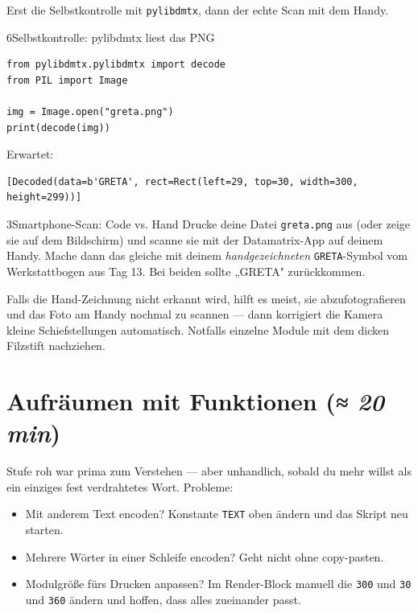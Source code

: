 Erst die Selbstkontrolle mit \texttt{pylibdmtx}, dann der echte
Scan mit dem Handy.

\begin{pythoneinheit}{6}{Selbstkontrolle: pylibdmtx liest das PNG}
\begin{verbatim}
from pylibdmtx.pylibdmtx import decode
from PIL import Image

img = Image.open("greta.png")
print(decode(img))
\end{verbatim}

Erwartet:
\begin{verbatim}
[Decoded(data=b'GRETA', rect=Rect(left=29, top=30, width=300, height=299))]
\end{verbatim}
\end{pythoneinheit}

\begin{bleistiftuebung}{3}{Smartphone-Scan: Code vs. Hand}
Drucke deine Datei \texttt{greta.png} aus (oder zeige sie auf dem
Bildschirm) und scanne sie mit der Datamatrix-App auf deinem Handy.
Mache dann das gleiche mit deinem \emph{handgezeichneten}
\texttt{GRETA}-Symbol vom Werkstattbogen aus Tag 13. Bei beiden
sollte „GRETA" zurückkommen.

Falls die Hand-Zeichnung nicht erkannt wird, hilft es meist, sie
abzufotografieren und das Foto am Handy nochmal zu scannen — dann
korrigiert die Kamera kleine Schiefstellungen automatisch. Notfalls
einzelne Module mit dem dicken Filzstift nachziehen.
\end{bleistiftuebung}

\section{Aufräumen mit Funktionen \normalfont(\textit{≈ 20 min})}

Stufe roh war prima zum Verstehen — aber unhandlich, sobald du
mehr willst als ein einziges fest verdrahtetes Wort. Probleme:

\begin{itemize}
\item Mit anderem Text encoden? Konstante \texttt{TEXT} oben
  ändern und das Skript neu starten.
\item Mehrere Wörter in einer Schleife encoden? Geht nicht ohne
  copy-pasten.
\item Modulgröße fürs Drucken anpassen? Im Render-Block
  manuell die \texttt{300} und \texttt{30} und \texttt{360}
  ändern und hoffen, dass alles zueinander passt.
\end{itemize}

